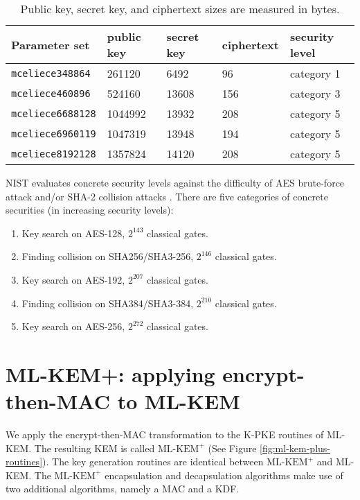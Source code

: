 \documentclass[runningheads]{llncs}
\def\mlkemplus{\text{ML-KEM}^+}
\begin{document}
\begin{table}[h]
    \centering
    \begin{tabular}{|p{8em}|p{5em}|p{5em}|p{5em}|p{8em}|}
        \hline
        Parameter set & public key & secret key & ciphertext & security level \cite{classic-mceliece-security-guide} \\
        \hline
        \texttt{mceliece348864} & 261120 & 6492 & 96 & category 1 \\
        \hline
        \texttt{mceliece460896} & 524160 & 13608 & 156 & category 3 \\
        \hline
        \texttt{mceliece6688128} & 1044992 & 13932 & 208 & category 5 \\
        \hline
        \texttt{mceliece6960119} & 1047319 & 13948 & 194 & category 5 \\
        \hline
        \texttt{mceliece8192128} & 1357824 & 14120 & 208 & category 5 \\
        \hline
    \end{tabular}
    \caption{Public key, secret key, and ciphertext sizes are measured in bytes.}\label{tab:classic-mceliece-parameter-sets}
\end{table}

NIST evaluates concrete security levels against the difficulty of AES brute-force attack and/or SHA-2 collision attacks \cite{NIST_PQC_Evaluation}. There are five categories of concrete securities (in increasing security levels): \begin{enumerate}
    \item Key search on AES-128, $2^{143}$ classical gates.
    \item Finding collision on SHA256/SHA3-256, $2^{146}$ classical gates.
    \item Key search on AES-192, $2^{207}$ classical gates.
    \item Finding collision on SHA384/SHA3-384, $2^{210}$ classical gates.
    \item Key search on AES-256, $2^{272}$ classical gates.
\end{enumerate}

\section{ML-KEM+: applying encrypt-then-MAC to ML-KEM}\label{sec:applying-encrypt-then-mac-to-ml-kem}
We apply the encrypt-then-MAC transformation to the K-PKE routines of ML-KEM. The resulting KEM is called $\mlkemplus$ (See Figure \ref{fig:ml-kem-plus-routines}). The key generation routines are identical between $\mlkemplus$ and ML-KEM. The $\mlkemplus$  encapsulation and decapsulation algorithms make use of two additional algorithms, namely a {\sf MAC} and a {\sf KDF}.
\end{document}
